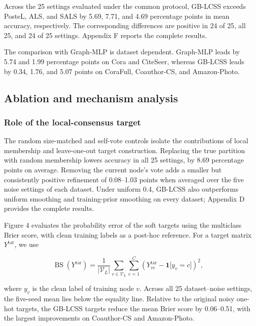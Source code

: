 \documentclass[10pt,letterpaper]{elsarticle}
\begin{document}
Across the 25 settings evaluated under the common protocol, GB-LCSS exceeds PosteL, ALS, and SALS by 5.69, 7.71, and 4.69 percentage points in mean accuracy, respectively. The corresponding differences are positive in 24 of 25, all 25, and 24 of 25 settings. Appendix F reports the complete results.

The comparison with Graph-MLP is dataset dependent. Graph-MLP leads by 5.74 and 1.99 percentage points on Cora and CiteSeer, whereas GB-LCSS leads by 0.34, 1.76, and 5.07 points on CoraFull, Coauthor-CS, and Amazon-Photo.

\subsection{Ablation and mechanism analysis}\label{sec:5.3}

\subsubsection{Role of the local-consensus target}\label{sec:5.3.1}

The random size-matched and self-vote controls isolate the contributions of local membership and leave-one-out target construction. Replacing the true partition with random membership lowers accuracy in all 25 settings, by 8.69 percentage points on average. Removing the current node's vote adds a smaller but consistently positive refinement of 0.08--1.03 points when averaged over the five noise settings of each dataset. Under uniform 0.4, GB-LCSS also outperforms uniform smoothing and training-prior smoothing on every dataset; Appendix D provides the complete results.

Figure 4 evaluates the probability error of the soft targets using the multiclass Brier score, with clean training labels as a post-hoc reference. For a target matrix \(Y^{\mathrm{tar}}\), we use

\[
\operatorname{BS}(Y^{\mathrm{tar}}) = \frac{1}{|\mathcal{V}_{L}|}\sum_{v \in \mathcal{V}_{L}}{\sum_{c = 1}^{C}\left( Y_{vc}^{\mathrm{tar}} - \mathbf{1}\lbrack y_{v} = c\rbrack \right)^{2}},
\]

where \(y_{v}\) is the clean label of training node \(v\). Across all 25 dataset--noise settings, the five-seed mean lies below the equality line. Relative to the original noisy one-hot targets, the GB-LCSS targets reduce the mean Brier score by 0.06--0.51, with the largest improvements on Coauthor-CS and Amazon-Photo.
\end{document}
